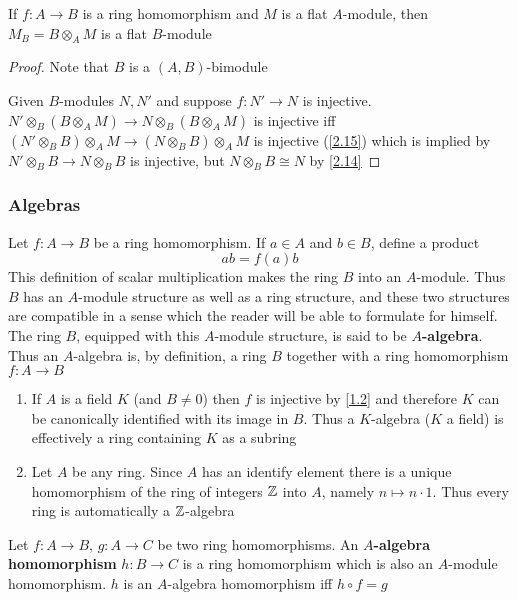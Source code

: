 \documentclass[11pt]{article}
\begin{document}
\begin{exercise}
If \(f:A\to B\) is a ring homomorphism and \(M\) is a flat \(A\)-module, then \(M_B=B\otimes_AM\) is a
flat \(B\)-module
\end{exercise}

\begin{proof}
Note that \(B\) is a \((A,B)\)-bimodule

Given \(B\)-modules \(N,N'\) and suppose \(f:N'\to N\) is injective.
\(N'\otimes_B(B\otimes_AM)\to N\otimes_B(B\otimes_AM)\) is injective iff
\((N'\otimes_BB)\otimes_AM\to(N\otimes_BB)\otimes_AM\) is injective (\ref{2.15}) which is implied by
\(N'\otimes_BB\to N\otimes_BB\) is injective, but \(N\otimes_BB\cong N\) by \ref{2.14}
\end{proof}
\subsubsection*{Algebras}
\label{sec:orgdda66ba}
Let \(f:A\to B\) be a ring homomorphism. If \(a\in A\) and \(b\in B\), define a product
\begin{equation*}
ab=f(a)b
\end{equation*}
This definition of scalar multiplication makes the ring \(B\) into an \(A\)-module. Thus \(B\)
has an \(A\)-module structure as well as a ring structure, and these two structures are
compatible in a sense which the reader will be able to formulate for himself. The ring \(B\),
equipped with this \(A\)-module structure, is said to be \textbf{\(A\)-algebra}. Thus an \(A\)-algebra
is, by definition, a ring \(B\) together with a ring homomorphism \(f:A\to B\)

\begin{remark}
\begin{enumerate}
\item If \(A\) is a field \(K\) (and \(B\neq 0\)) then \(f\) is injective by \ref{1.2} and
therefore \(K\) can be canonically identified with its image in \(B\). Thus a \(K\)-algebra
(\(K\) a field) is effectively a ring containing \(K\) as a subring
\item Let \(A\) be any ring. Since \(A\) has an identify element there is a unique homomorphism of
the ring of integers \(\mathbb{Z}\) into \(A\), namely \(n\mapsto n\cdot 1\). Thus every ring is automatically
a \(\mathbb{Z}\)-algebra
\end{enumerate}
\end{remark}

Let \(f:A\to B\), \(g:A\to C\) be two ring homomorphisms. An \textbf{\(A\)-algebra homomorphism} \(h:B\to C\)
is a ring homomorphism which is also an \(A\)-module homomorphism. \(h\) is an \(A\)-algebra
homomorphism iff \(h\circ f=g\)
\end{document}
